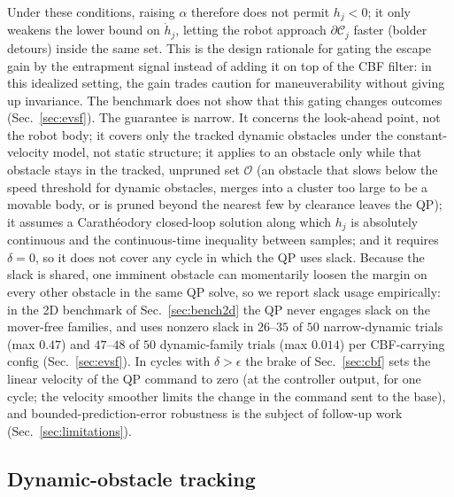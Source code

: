 \documentclass[journal]{IEEEtran}
\begin{document}
Under these conditions, raising $\alpha$ therefore does not permit
$h_j<0$; it only weakens the lower bound on $\dot h_j$, letting the robot
approach $\partial\mathcal{C}_j$ faster (bolder detours) inside the same
set. This is the design rationale for gating the escape gain by the
entrapment signal instead of adding it on top of the CBF filter: in this
idealized setting, the gain trades caution for maneuverability without
giving up invariance. The benchmark does not show that this gating
changes outcomes (Sec.~\ref{sec:evsf}). The guarantee is narrow. It
concerns the look-ahead point, not the robot body; it covers only the
tracked dynamic obstacles under the constant-velocity model, not static
structure; it applies to an obstacle only while that obstacle stays in the
tracked, unpruned set $\mathcal{O}$ (an obstacle that slows below the
speed threshold for dynamic obstacles, merges into a cluster too large to
be a movable body, or is pruned beyond the nearest few by clearance leaves
the QP); it assumes a Carath\'eodory closed-loop solution along which $h_j$ is absolutely continuous and the
continuous-time inequality between samples; and it
requires $\delta=0$, so it does not cover any cycle in which the QP uses
slack. Because the slack is shared, one imminent obstacle can momentarily
loosen the margin on every other obstacle in the same QP solve, so we
report slack usage empirically: in the 2D benchmark of
Sec.~\ref{sec:bench2d} the QP never engages slack on the mover-free
families, and uses nonzero slack in $26$--$35$ of $50$ narrow-dynamic
trials (max $0.47$) and $47$--$48$ of $50$ dynamic-family trials (max
$0.014$) per CBF-carrying config (Sec.~\ref{sec:evsf}). In cycles with
$\delta>\epsilon$ the brake of Sec.~\ref{sec:cbf} sets the linear velocity of the QP command to zero
(at the controller output, for one cycle; the velocity smoother limits the change in the command sent to the base),
and bounded-prediction-error robustness is the subject of follow-up work
(Sec.~\ref{sec:limitations}).

\subsection{Dynamic-obstacle tracking}
\label{sec:tracking}
\end{document}
